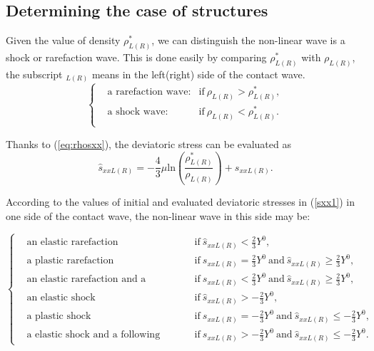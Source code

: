 \documentclass{article}
\numberwithin{equation}{section}
\numberwithin{table}{section}
\begin{document}
\subsection{Determining the case of structures} \label{sec:deter}

Given the value of density $\rho^*_{L(R)}$, we can distinguish the non-linear wave is a shock or rarefaction wave.  This is done easily by comparing $\rho^*_{L(R)}$ with $\rho_{L(R)}$, the subscript $_{L(R)}$ means in the left(right) side of the contact wave.
\begin{equation}\label{shock1}
  \left\{
  \begin{aligned}
	& \text{a rarefaction wave:} & \text{if} \ \rho_{L(R)} > \rho_{L(R)}^*,\\
	& \text{a shock wave:} &   \text{if} \ \rho_{L(R)} < \rho_{L(R)}^*.\\
\end{aligned}\right.
\end{equation}

Thanks to (\ref{eq:rhosxx}),
the deviatoric stress can be evaluated as
\begin{equation}  \label{sxx1}
\hat{s}_{xxL(R)}=-\frac{4}{3}\mu\text{ln}\left(\frac{\rho_{L(R)}^*}{\rho_{L(R)}}\right)+s_{xxL(R)}.
\end{equation}

According to the values of initial and evaluated deviatoric stresses in (\ref{sxx1}) in one side of the contact wave, the non-linear wave in this side may be:

\begin{equation} \label{yield1}
  \left\{
  \begin{aligned}
	& \text{an elastic  rarefaction} & \text{if}  \ \hat{s}_{xxL(R)}<\frac{2}{3}Y^{0},\\
	& \text{a plastic rarefaction} & \text{if} \ {s}_{xxL(R)} = \frac{2}{3}Y^{0} \ \text{and} \ \hat{s}_{xxL(R)} \geq \frac{2}{3}Y^{0},\\
	& \text{an elastic rarefaction  and a following plastic rarefaction} &  \text{if} \ {s}_{xxL(R)} < \frac{2}{3}Y^{0} \ \text{and} \ \hat{s}_{xxL(R)} \geq \frac{2}{3}Y^{0},\\
	& \text{an elastic shock} & \text{if}  \ \hat{s}_{xxL(R)}> -\frac{2}{3}Y^{0},\\
	& \text{a plastic shock} & \text{if} \ {s}_{xxL(R)} = -\frac{2}{3}Y^{0} \ \text{and} \ \hat{s}_{xxL(R)} \leq -\frac{2}{3}Y^{0},\\
	& \text{a elastic shock and a following plastic shock} &  \text{if} \ {s}_{xxL(R)} > -\frac{2}{3}Y^{0} \ \text{and} \ \hat{s}_{xxL(R)} \leq -\frac{2}{3}Y^{0}.
\end{aligned}\right.
\end{equation}
\end{document}
